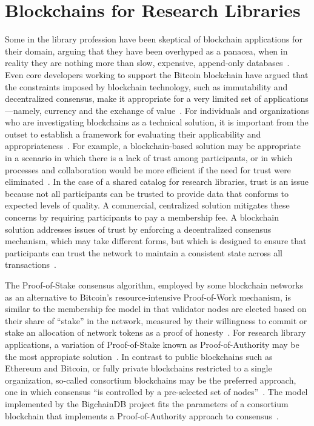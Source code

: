 \section{Blockchains for Research Libraries}
Some in the library profession have been skeptical of blockchain
applications for their domain, arguing that they have been overhyped as a
panacea, when in reality they are nothing more than slow, expensive,
append-only databases~\cite{sjsu18}. Even core developers working to support
the Bitcoin blockchain have argued that the constraints imposed by
blockchain technology, such as immutability and decentralized consensus,
make it appropriate for a very limited set of applications---namely,
currency and the exchange of value~\cite{jSong18}. For individuals and
organizations who are investigating blockchains as a technical solution, it
is important from the outset to establish a framework for evaluating their
applicability and appropriateness~\cite{bS28}. For example, a
blockchain-based solution may be appropriate in a scenario in which there is
a lack of trust among participants, or in which processes and collaboration
would be more efficient if the need for trust were eliminated~\cite{bS28}.
In the case of a shared catalog for research libraries, trust is an issue
because not all participants can be trusted to provide data that conforms to
expected levels of quality. A commercial, centralized solution mitigates
these concerns by requiring participants to pay a membership fee. A
blockchain solution addresses issues of trust by enforcing a decentralized
consensus mechanism, which may take different forms, but which is designed
to ensure that participants can trust the network to maintain a consistent
state across all transactions~\cite{buchman2018latest}.

The Proof-of-Stake consensus algorithm, employed by some blockchain
networks as an alternative to Bitcoin's resource-intensive Proof-of-Work
mechanism, is similar to the membership fee model in that validator nodes
are elected based on their share of ``stake'' in the network, measured by
their willingness to commit or stake an allocation of network tokens as a
proof of honesty~\cite{gMarin18}. For research library applications, a
variation of Proof-of-Stake known as Proof-of-Authority may be the most
appropiate solution~\cite{gMarin18, vButerin15}. In contrast to public
blockchains such as Ethereum and Bitcoin, or fully private blockchains
restricted to a single organization, so-called consortium blockchains may be
the preferred approach, one in which consensus ``is controlled by a
pre-selected set of nodes''~\cite{vButerin15}. The model implemented by the
BigchainDB project fits the parameters of a consortium blockchain that
implements a Proof-of-Authority approach to consensus~\cite{bdb18b}.

